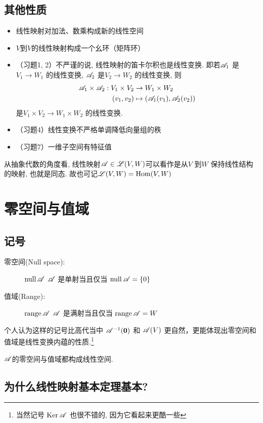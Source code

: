 \subsection{其他性质}
\begin{itemize}
    \item 线性映射对加法、数乘构成新的线性空间
    \item \(V\)到\(V\)的线性映射构成一个幺环（矩阵环）
    \item （习题1, 2）不严谨的说, 线性映射的笛卡尔积也是线性变换. 即若\(\mathscr{A}_{1}\)
        是\(V_{1} \to W_{1}\) 的线性变换, \(\mathscr{A}_{2}\)
        是\(V_{2} \to W_{2}\) 的线性变换, 则
        \begin{align*}
            \mathscr{A}_{1} \times \mathscr{A}_{2} : V_{1}
            \times V_{2} &\to W_{1} \times W_{2}\\
            (v_{1},v_{2}) &\mapsto
            (\mathscr{A}_{1}(v_{1}),\mathscr{A}_{2}(v_{2}))
        \end{align*}
        是\(V_{1} \times V_{2} \to
        W_{1} \times W_{2}\) 的线性变换.
    \item （习题4）线性变换不严格单调降低向量组的秩
    \item （习题7）一维子空间有特征值
\end{itemize}

从抽象代数的角度看, 线性映射\(\mathscr{A} \in \mathscr{L}(V,W)\)可以看作是从\(V\) 到\(W\)
保持线性结构的映射, 也就是同态. 故也可记\(\mathscr{L}(V,W)=\operatorname{Hom}(V,W)\)

\section{零空间与值域}
\subsection{记号}
\begin{description}
    \item[零空间(Null space):] \(\operatorname{null} \mathscr{A}\)
        \(\mathscr{A}\) 是单射当且仅当
        \(\operatorname{null} \mathscr{A} = \{0\}\)
    \item[值域(Range):] \(\operatorname{range} \mathscr{A}\)
        \(\mathscr{A}\) 是满射当且仅当
        \(\operatorname{range} \mathscr{A} = W\)
\end{description}
个人认为这样的记号比高代当中 \(\mathscr{A}^{-1}(\mathbf{0})\) 和 \(\mathscr{A}(V)\)
更自然，更能体现出零空间和值域是线性变换内蕴的性质.\footnote{当然记号
    \(\operatorname{Ker} \mathscr{A}\) 也很不错的,
因为它看起来更酷一些 }

\(\mathscr{A}\)的零空间与值域都构成线性空间.

\subsection{为什么线性映射基本定理基本?}

